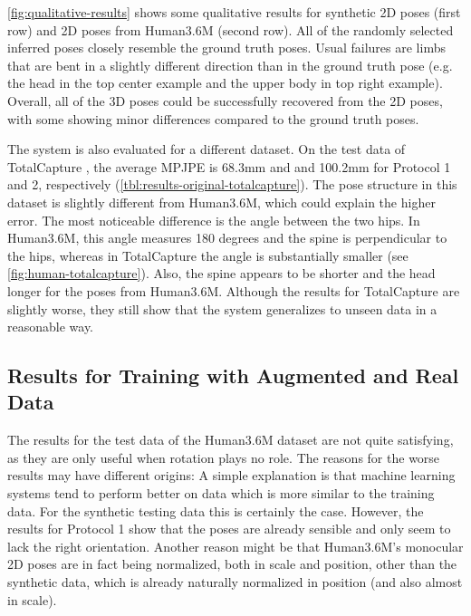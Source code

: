 

\autoref{fig:qualitative-results} shows some qualitative results for synthetic 2D poses (first row) and 2D poses from Human3.6M (second row).
All of the randomly selected inferred poses closely resemble the ground truth poses.
Usual failures are limbs that are bent in a slightly different direction than in the ground truth pose (e.g. the head in the top center example and the upper body in top right example).
Overall, all of the 3D poses could be successfully recovered from the 2D poses, with some showing minor differences compared to the ground truth poses.

The system is also evaluated for a different dataset.
On the test data of TotalCapture \cite{trumble17}, the average MPJPE is 68.3mm and and 100.2mm for Protocol 1 and 2, respectively (\autoref{tbl:results-original-totalcapture}).
The pose structure in this dataset is slightly different from Human3.6M, which could explain the higher error.
The most noticeable difference is the angle between the two hips.
In Human3.6M, this angle measures 180 degrees and the spine is perpendicular to the hips, whereas in TotalCapture the angle is substantially smaller (see \autoref{fig:human-totalcapture}).
Also, the spine appears to be shorter and the head longer for the poses from Human3.6M.
Although the results for TotalCapture are slightly worse, they still show that the system generalizes to unseen data in a reasonable way.




\subsection{Results for Training with Augmented and Real Data}
\label{sec:results-augmented}
The results for the test data of the Human3.6M dataset are not quite satisfying, as they are only useful when rotation plays no role.
The reasons for the worse results may have different origins:
A simple explanation is that machine learning systems tend to perform better on data which is more similar to the training data.
For the synthetic testing data this is certainly the case.
However, the results for Protocol 1 show that the poses are already sensible and only seem to lack the right orientation.
Another reason might be that Human3.6M's monocular 2D poses are in fact being normalized, both in scale and position, other than the synthetic data, which is already naturally normalized in position (and also almost in scale).

